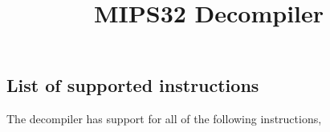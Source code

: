 
\newcommand{\titlename}{MIPS32 Decompiler}
\title{\titlename}





\tableofcontents
\clearpage



%
% 
% 
% 
% 
% 
% 
%




\begin{appendix}



\clearpage

\section{List of supported instructions}

The decompiler has support for all of the following instructions,


\end{appendix}
